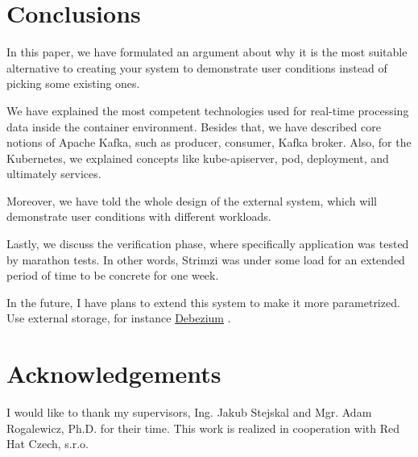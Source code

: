 \documentclass{ExcelAtFIT}
\begin{document}
\section{Conclusions}
\label{sec:Conclusions}

In this paper, we have formulated an argument about why it is the most suitable alternative to creating your system to demonstrate user conditions instead of picking some existing ones. 

We have explained the most competent technologies used for real-time processing data inside the container environment.  Besides that, we have described core notions of Apache Kafka, such as producer, consumer, Kafka broker. Also, for the Kubernetes, we explained concepts like kube-apiserver, pod, deployment, and ultimately services.  

Moreover, we have told the whole design of the external system, which will demonstrate user conditions with different workloads. 

Lastly, we discuss the verification phase, where specifically application was tested by marathon tests. In other words, Strimzi was under some load for an extended period of time to be concrete for one week.

In the future, I have plans to extend this system to make it more parametrized. Use external storage, for instance \href{https://debezium.io/}{Debezium} \cite{Debezium}. 


\section*{Acknowledgements}
I would like to thank my supervisors, Ing. Jakub Stejskal and Mgr. Adam Rogalewicz, Ph.D. for their time. This work is realized in cooperation with Red Hat Czech, s.r.o.




\end{document}
